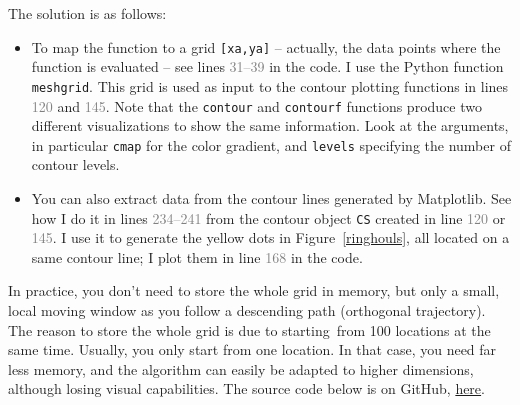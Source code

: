 \documentclass[oneside,10pt]{book}
\begin{document}
\noindent The solution is as follows: 
\vspace{1ex}

\begin{itemize}
\item To map the function to a grid \texttt{[xa,ya]} -- actually, the data points where the function is evaluated -- see lines \textcolor{gray}{31--39} in the code.
 I use the Python function \texttt{meshgrid}. This grid is used as input to the contour plotting functions
 in lines \textcolor{gray}{120} and \textcolor{gray}{145}. 
Note that the \texttt{contour} and \texttt{contourf} functions produce two different visualizations to show the same information.
Look at the arguments, in particular \texttt{cmap} for the color gradient, and \texttt{levels} specifying the number of contour levels.
\item You can also extract data from the contour lines generated by Matplotlib. See how I do it in lines 
\textcolor{gray}{234--241} from the contour object \texttt{CS} created in line \textcolor{gray}{120} or \textcolor{gray}{145}. 
I use it to generate the yellow dots in Figure~\ref{ringhouls}, all located on a same contour line; I plot them 
in line \textcolor{gray}{168} in the code.
\end{itemize}
\vspace{1ex}

In practice, you don't need to store the whole grid in memory, but only a small, local moving window as you follow a descending path (orthogonal trajectory). 
The reason to store the whole grid is due to starting~from 100 locations at the same time. Usually, you only start from one location. In that case,
 you need far less memory, and the algorithm can easily be adapted to higher dimensions, although losing visual capabilities. 
The source code below is on GitHub, \href{https://github.com/VincentGranville/Experimental-Math-Number-Theory/blob/main/Source-Code/gradient.py}{here}. 


\vspace{1ex}
\end{document}
